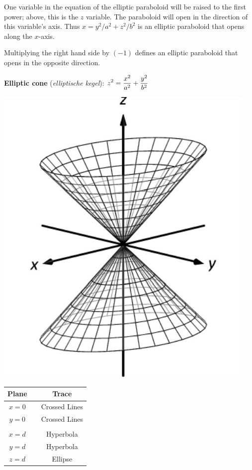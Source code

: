 One variable in the equation of the elliptic paraboloid will be raised to the first power; above, this is the $z$ variable. The paraboloid will open in the direction of this variable's axis. Thus $x= y^2/a^2+z^2/b^2$ is an elliptic paraboloid that opens along the $x$-axis.

Multiplying the right hand side by $(-1)$ defines an elliptic paraboloid that opens in the opposite direction.

\ifanalysis\pagebreak\fi
\textbf{Elliptic cone} (\textit{elliptische kegel}): \quad$\displaystyle z^2=\frac{x^2}{a^2}+\frac{y^2}{b^2}$

   

\begin{minipage}[c]{.3\linewidth}
\vskip0pt
\includegraphics[width=0.95\textwidth]{fig_ana_geo_18a}
\end{minipage}
\begin{minipage}[c]{.45\linewidth}
\vskip0pt\hskip 10pt
\begin{tabular}[]{ccc}
\textbf{Plane}  & & \textbf{Trace} \\ \hline
$x=0$ & & Crossed Lines \\
$y=0$ & & Crossed Lines\\
\\
$x=d$ & & Hyperbola\\
$y=d$ & & Hyperbola\\
$z=d$ & & Ellipse
\end{tabular}
\end{minipage}%

